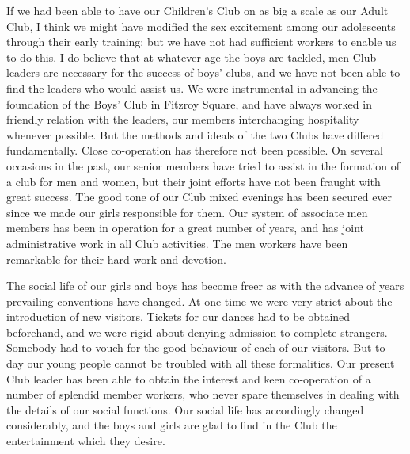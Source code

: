 If we had been able to have our Children’s Club on as
big a scale as our Adult Club, I think we might have
modified the sex excitement among our adolescents
through their early training; but we have not had sufficient
workers to enable us to do this. I do believe that at
whatever age the boys are tackled, men Club leaders are
necessary for the success of boys’ clubs, and we have not
been able to find the leaders who would assist us. We
were instrumental in advancing the foundation of the
Boys’ Club in Fitzroy Square, and have always worked in
friendly relation with the leaders, our members interchanging
hospitality whenever possible. But the methods
and ideals of the two Clubs have differed fundamentally.
Close co-operation has therefore not been possible. On
several occasions in the past, our senior members have
tried to assist in the formation of a club for men and
women, but their joint efforts have not been fraught
with great success. The good tone of our Club mixed
evenings has been secured ever since we made our girls
responsible for them. Our system of associate men members
has been in operation for a great number of years,
and has joint administrative work in all Club activities.
The men workers have been remarkable for their hard
work and devotion.

The social life of our girls and boys has become freer
as with the advance of years prevailing conventions have
changed. At one time we were very strict about the
introduction of new visitors. Tickets for our dances had
to be obtained beforehand, and we were rigid about denying
admission to complete strangers. Somebody had to
vouch for the good behaviour of each of our visitors. But
to-day our young people cannot be troubled with all these
formalities. Our present Club leader has been able to
obtain the interest and keen co-operation of a number of
splendid member workers, who never spare themselves in
dealing with the details of our social functions. Our social
life has accordingly changed considerably, and the boys
and girls are glad to find in the Club the entertainment
which they desire.


